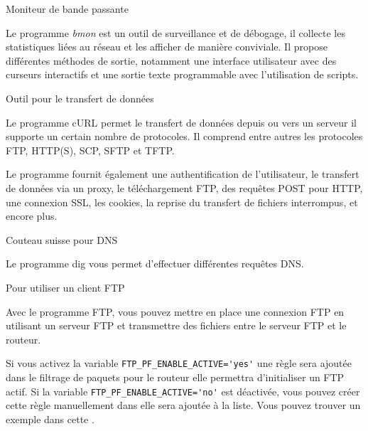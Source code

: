 \begin{description}

 Moniteur de bande passante

    Le programme \emph{bmon} est un outil de surveillance et de débogage,
    il collecte les statistiques liées au réseau et les afficher de manière
    conviviale. Il propose différentes méthodes de sortie, notamment une
    interface utilisateur avec des curseurs interactifs et une sortie texte
    programmable avec l'utilisation de scripts.

 Outil pour le transfert de données

    Le programme cURL permet le transfert de données depuis ou vers un serveur
	il supporte un certain nombre de protocoles. Il comprend entre autres les protocoles
	FTP, HTTP(S), SCP, SFTP et TFTP.

    Le programme fournit également une authentification de l'utilisateur, le transfert
	de données via un proxy, le téléchargement FTP, des requêtes POST pour HTTP,
	une connexion SSL, les cookies, la reprise du transfert de fichiers interrompus,
	et encore plus.


 Couteau suisse pour DNS

    Le programme dig vous permet d'effectuer différentes requêtes DNS.

 Pour utiliser un client FTP

    Avec le programme FTP, vous pouvez mettre en place une connexion FTP en
    utilisant un serveur FTP et transmettre des fichiers entre le serveur FTP
    et le routeur.


    Si vous activez la variable \verb+FTP_PF_ENABLE_ACTIVE='yes'+ une règle
    sera ajoutée dans le filtrage de paquets pour le routeur elle permettra
    d'initialiser un FTP actif. Si la variable \verb+FTP_PF_ENABLE_ACTIVE='no'+
    est déactivée, vous pouvez créer cette règle manuellement dans
     elle sera ajoutée à la liste. Vous pouvez trouver
    un exemple dans cette .


\end{description}
